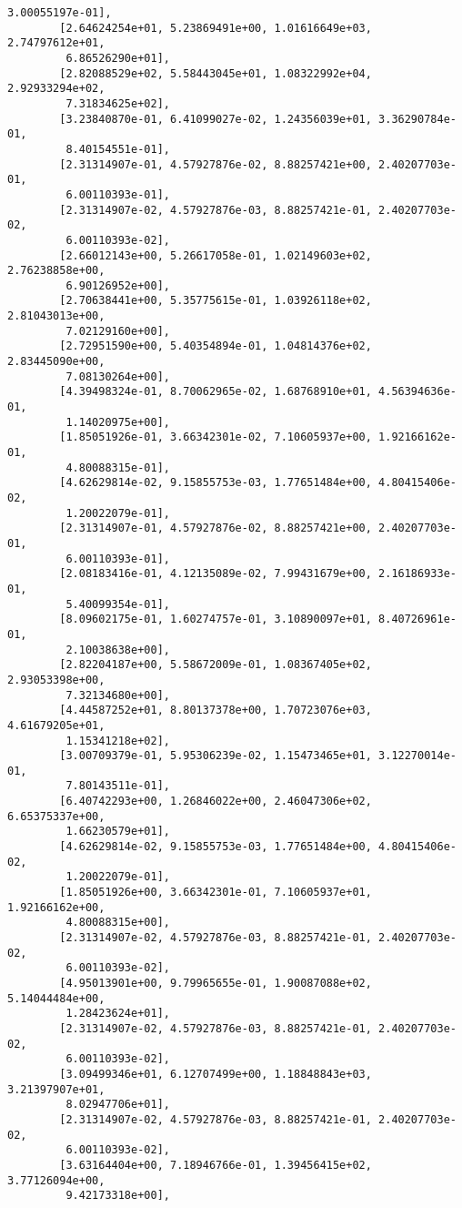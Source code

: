 \documentclass[11pt]{article}
\begin{document}
\begin{tcolorbox}[breakable, size=fbox, boxrule=.5pt, pad at break*=1mm, opacityfill=0]
\begin{Verbatim}[commandchars=\\\{\}]
         3.00055197e-01],
        [2.64624254e+01, 5.23869491e+00, 1.01616649e+03, 2.74797612e+01,
         6.86526290e+01],
        [2.82088529e+02, 5.58443045e+01, 1.08322992e+04, 2.92933294e+02,
         7.31834625e+02],
        [3.23840870e-01, 6.41099027e-02, 1.24356039e+01, 3.36290784e-01,
         8.40154551e-01],
        [2.31314907e-01, 4.57927876e-02, 8.88257421e+00, 2.40207703e-01,
         6.00110393e-01],
        [2.31314907e-02, 4.57927876e-03, 8.88257421e-01, 2.40207703e-02,
         6.00110393e-02],
        [2.66012143e+00, 5.26617058e-01, 1.02149603e+02, 2.76238858e+00,
         6.90126952e+00],
        [2.70638441e+00, 5.35775615e-01, 1.03926118e+02, 2.81043013e+00,
         7.02129160e+00],
        [2.72951590e+00, 5.40354894e-01, 1.04814376e+02, 2.83445090e+00,
         7.08130264e+00],
        [4.39498324e-01, 8.70062965e-02, 1.68768910e+01, 4.56394636e-01,
         1.14020975e+00],
        [1.85051926e-01, 3.66342301e-02, 7.10605937e+00, 1.92166162e-01,
         4.80088315e-01],
        [4.62629814e-02, 9.15855753e-03, 1.77651484e+00, 4.80415406e-02,
         1.20022079e-01],
        [2.31314907e-01, 4.57927876e-02, 8.88257421e+00, 2.40207703e-01,
         6.00110393e-01],
        [2.08183416e-01, 4.12135089e-02, 7.99431679e+00, 2.16186933e-01,
         5.40099354e-01],
        [8.09602175e-01, 1.60274757e-01, 3.10890097e+01, 8.40726961e-01,
         2.10038638e+00],
        [2.82204187e+00, 5.58672009e-01, 1.08367405e+02, 2.93053398e+00,
         7.32134680e+00],
        [4.44587252e+01, 8.80137378e+00, 1.70723076e+03, 4.61679205e+01,
         1.15341218e+02],
        [3.00709379e-01, 5.95306239e-02, 1.15473465e+01, 3.12270014e-01,
         7.80143511e-01],
        [6.40742293e+00, 1.26846022e+00, 2.46047306e+02, 6.65375337e+00,
         1.66230579e+01],
        [4.62629814e-02, 9.15855753e-03, 1.77651484e+00, 4.80415406e-02,
         1.20022079e-01],
        [1.85051926e+00, 3.66342301e-01, 7.10605937e+01, 1.92166162e+00,
         4.80088315e+00],
        [2.31314907e-02, 4.57927876e-03, 8.88257421e-01, 2.40207703e-02,
         6.00110393e-02],
        [4.95013901e+00, 9.79965655e-01, 1.90087088e+02, 5.14044484e+00,
         1.28423624e+01],
        [2.31314907e-02, 4.57927876e-03, 8.88257421e-01, 2.40207703e-02,
         6.00110393e-02],
        [3.09499346e+01, 6.12707499e+00, 1.18848843e+03, 3.21397907e+01,
         8.02947706e+01],
        [2.31314907e-02, 4.57927876e-03, 8.88257421e-01, 2.40207703e-02,
         6.00110393e-02],
        [3.63164404e+00, 7.18946766e-01, 1.39456415e+02, 3.77126094e+00,
         9.42173318e+00],

\end{Verbatim}
\end{tcolorbox}
\end{document}
